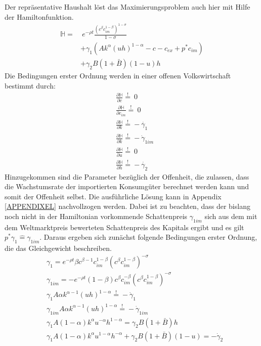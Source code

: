 Der repräsentative Haushalt löst das Maximierungsproblem auch hier mit Hilfe der Hamiltonfunktion.
\begin{equation}
\begin{split}\mathbb{H}=&~e^{-\rho t}\frac{(c^\beta c_{im}^{1-\beta})^{1-\sigma}}{1-\sigma}\\
&+\gamma_1(Ak^\alpha(uh)^{1-\alpha}-c-c_{ex}+p^*c_{im})\\
&+\gamma_2B(1+\bar{B})(1-u)h\end{split}
\end{equation}
Die Bedingungen erster Ordnung werden in einer offenen Volkswirtschaft bestimmt durch:
\begin{align}
&\frac{\partial\mathbb{H}}{\partial c}\overset{!}{=}~0\label{eq:lfoc1EL}\\
&\frac{\partial\mathbb{H}}{\partial c_{im}}\overset{!}{=}~0\label{eq:lfoc1imEL}\\
&\frac{\partial\mathbb{H}}{\partial k}\overset{!}{=}-\dot{\gamma_1}\label{eq:lfoc3EL}\\
&\frac{\partial\mathbb{H}}{\partial k}\overset{!}{=}-\dot{\gamma}_{1im}\label{eq:lfoc3imEL}\\
&\frac{\partial\mathbb{H}}{\partial u}\overset{!}{=}~0\label{eq:lfoc4EL}\\
&\frac{\partial\mathbb{H}}{\partial h}\overset{!}{=}-\dot{\gamma_2}\label{eq:lfoc5EL}
\end{align}
Hinzugekommen sind die Parameter bezüglich der Offenheit, die zulassen, dass die Wachstumsrate der importierten Konsumgüter berechnet werden kann und somit der Offenheit selbst. Die ausführliche Lösung kann in Appendix \ref{APPENDIXEL} nachvollzogen werden. Dabei ist zu beachten, dass der bislang noch nicht in der Hamiltonian vorkommende Schattenpreis $\gamma_{1im}$ sich aus dem mit dem Weltmarktpreis bewerteten Schattenpreis des Kapitals ergibt und es gilt $p^*\gamma_{1} \hat{=} \gamma_{1im}$. Daraus ergeben sich zunächst folgende Bedingungen erster Ordnung, die das Gleichgewicht beschreiben.
\begin{align}
&\gamma_1=e^{-\rho t}\beta c^{\beta-1}c_{im}^{1-\beta}(c^\beta c_{im}^{1-\beta})^{-\sigma}\label{eq:foc1EL}\\
&\gamma_{1im}=-e^{-\rho t}(1-\beta) c^{\beta}c_{im}^{-\beta}(c^\beta c_{im}^{1-\beta})^{-\sigma}\label{eq:foc1imEL}\\
&\gamma_{1}A \alpha k^{\alpha -1} (uh)^{1- \alpha}\overset{!}{=} - \dot{\gamma}_{1}\label{eq:foc2EL}\\
&\gamma_{1im}A\alpha k^{\alpha -1}(uh)^{1- \alpha}\overset{!}{=} - \dot{\gamma}_{1im}\label{eq:foc2imEL}\\
&\gamma_{1}A(1- \alpha) k^{\alpha}u^{- \alpha}h^{1- \alpha}  = \gamma_{2} B (1+\bar{B}) h \label{eq:foc3EL}\\
&\gamma_{1} A (1- \alpha)k^{\alpha} u^{1- \alpha}  h^{- \alpha} + \gamma_{2} B (1+\bar{B}) (1- u) = - \dot{\gamma}_{2}\label{eq:foc4EL}
\end{align}
